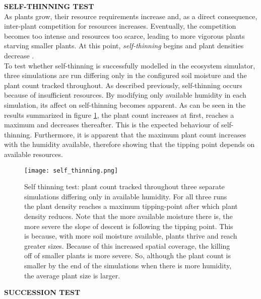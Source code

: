 \textbf{SELF-THINNING TEST}\\

As plants grow, their resource requirements increase and, as a direct consequence, inter-plant competition for resources increases. Eventually, the competition becomes too intense and resources too scarce, leading to more vigorous plants starving smaller plants. At this point, \textit{self-thinning} begins and plant densities decrease \cite{Lane2002}.\\
To test whether self-thinning is successfully modelled in the ecosystem simulator, three simulations are run differing only in the configured soil moisture and the plant count tracked throughout. As described previously, self-thinning occurs because of insufficient resources. By modifying only available humidity in each simulation, its affect on self-thinning becomes apparent. As can be seen in the results summarized in figure \ref{fig:self_thinning_test_results}, the plant count increases at first, reaches a maximum and decreases thereafter. This is the expected behaviour of self-thinning. Furthermore, it is apparent that the maximum plant count increases with the humidity available, therefore showing that the tipping point depends on available resources.\\

\begin{figure}
\center
	\texttt{[image: self\_thinning.png]}
	\caption{ Self thinning test: plant count tracked throughout three separate simulations differing only in available humidity. For all three runs the plant density reaches a maximum tipping-point after which plant density reduces. Note that the more available moisture there is, the more severe the slope of descent is following the tipping point. This is because, with more soil moisture available, plants thrive and reach greater sizes. Because of this increased spatial coverage, the killing off of smaller plants is more severe. So, although the plant count is smaller by the end of the simulations when there is more humidity, the average plant size is larger.}
	\label{fig:self_thinning_test_results}
\end{figure}

\textbf{SUCCESSION TEST}\\

